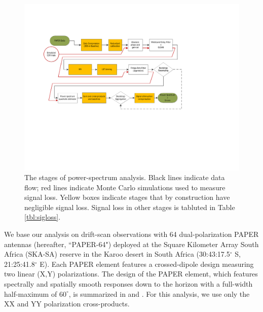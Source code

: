 \documentclass[twocolumn,numberedappendix]{emulateapj} \shorttitle{New Limits on the 21 cm Power Spectrum at $z=8.4$}
\begin{document}
\begin{figure}
\includegraphics[width=2\columnwidth,trim=0cm 7cm 5cm 2cm,clip]{plots/data_flow_chart.pdf}
\caption
{
The stages of power-spectrum analysis. Black lines indicate data flow; red lines indicate
Monte Carlo simulations used to 
measure signal loss. Yellow boxes indicate stages that by construction have negligible signal loss.
Signal loss in other stages is tabluted in Table \ref{tbl:sigloss}.
}
\label{fig:flowchart}
\end{figure}

We base our analysis on drift-scan observations 
with 64 dual-polarization PAPER antennas (hereafter, ``PAPER-64") deployed 
at the Square Kilometer Array South Africa
(SKA-SA) reserve in the Karoo desert in South Africa
(30:43:17.5$^\circ$ S, 21:25:41.8$^\circ$ E).
Each PAPER element features a crossed-dipole design measuring two
linear (X,Y) polarizations.
The design of the PAPER element, 
which features spectrally and spatially smooth responses 
down to the horizon with a full-width half-maximum of $60^{\circ}$, is summarized in \citet{parsons_et_al2010}
and \citet{pober_et_al2012}.  
For this analysis, we use only the XX and YY polarization cross-products.
\end{document}
